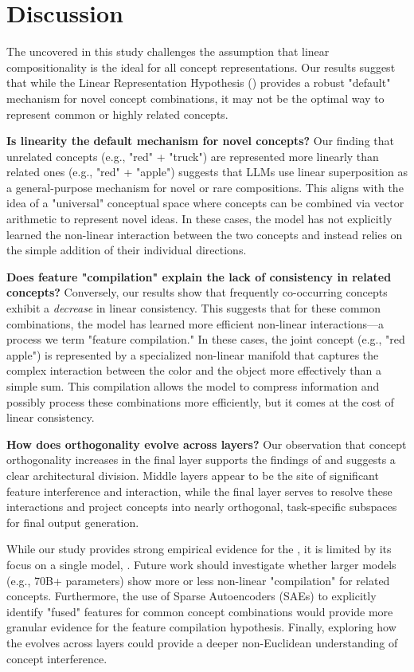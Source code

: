 \section{Discussion}
\label{sec:discussion}

The \consistencyparadox uncovered in this study challenges the assumption that linear compositionality is the ideal for all concept representations. Our results suggest that while the Linear Representation Hypothesis (\lrh) provides a robust "default" mechanism for novel concept combinations, it may not be the optimal way to represent common or highly related concepts.

{\bf Is linearity the default mechanism for novel concepts?} 
Our finding that unrelated concepts (e.g., "red" + "truck") are represented more linearly than related ones (e.g., "red" + "apple") suggests that LLMs use linear superposition as a general-purpose mechanism for novel or rare compositions. This aligns with the idea of a "universal" conceptual space where concepts can be combined via vector arithmetic to represent novel ideas. In these cases, the model has not explicitly learned the non-linear interaction between the two concepts and instead relies on the simple addition of their individual directions.

{\bf Does feature "compilation" explain the lack of consistency in related concepts?}
Conversely, our results show that frequently co-occurring concepts exhibit a \textit{decrease} in linear consistency. This suggests that for these common combinations, the model has learned more efficient non-linear interactions---a process we term "feature compilation." In these cases, the joint concept (e.g., "red apple") is represented by a specialized non-linear manifold that captures the complex interaction between the color and the object more effectively than a simple sum. This compilation allows the model to compress information and possibly process these combinations more efficiently, but it comes at the cost of linear consistency.

{\bf How does orthogonality evolve across layers?}
Our observation that concept orthogonality increases in the final layer supports the findings of \citet{azizian2025geometries} and suggests a clear architectural division. Middle layers appear to be the site of significant feature interference and interaction, while the final layer serves to resolve these interactions and project concepts into nearly orthogonal, task-specific subspaces for final output generation.

 While our study provides strong empirical evidence for the \consistencyparadox, it is limited by its focus on a single model, \qwen. Future work should investigate whether larger models (e.g., 70B+ parameters) show more or less non-linear "compilation" for related concepts. Furthermore, the use of Sparse Autoencoders (SAEs) to explicitly identify "fused" features for common concept combinations would provide more granular evidence for the feature compilation hypothesis. Finally, exploring how the \cip evolves across layers could provide a deeper non-Euclidean understanding of concept interference.
